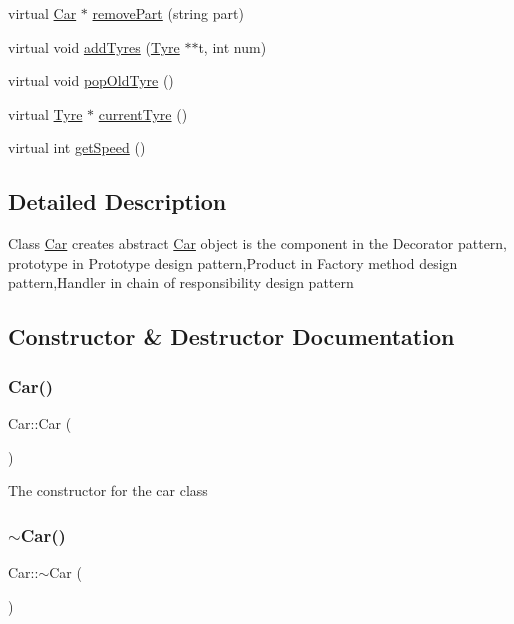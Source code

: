 \begin{DoxyCompactItemize}
\item 
virtual \hyperlink{classCar}{Car} $\ast$ \hyperlink{classCar_a54018ac7e84e79c8bfc1a8fba5e45b16}{remove\+Part} (string part)
\item 
virtual void \hyperlink{classCar_a5c5f22cb9232b88a53a4ffc324824aa1}{add\+Tyres} (\hyperlink{classTyre}{Tyre} $\ast$$\ast$t, int num)
\item 
virtual void \hyperlink{classCar_a5859a9475be0c26341ca4f3acf23a2ea}{pop\+Old\+Tyre} ()
\item 
virtual \hyperlink{classTyre}{Tyre} $\ast$ \hyperlink{classCar_aadd6f69cf389b293a5e8a098ebc75f1d}{current\+Tyre} ()
\item 
virtual int \hyperlink{classCar_a18e48b5cf9815216b8e82351d36b8d9f}{get\+Speed} ()
\end{DoxyCompactItemize}


\subsection{Detailed Description}
Class \hyperlink{classCar}{Car} creates abstract \hyperlink{classCar}{Car} object is the component in the Decorator pattern, prototype in Prototype design pattern,Product in Factory method design pattern,Handler in chain of responsibility design pattern 

\subsection{Constructor \& Destructor Documentation}
\mbox{\label{classCar_a1c803f7c5038d3e31b368b0d0a35493c}} 
\subsubsection{\texorpdfstring{Car()}{Car()}}
{\footnotesize\ttfamily Car\+::\+Car (\begin{DoxyParamCaption}{ }\end{DoxyParamCaption})}

The constructor for the car class \mbox{\label{classCar_a5933bb06e96b159fe339a128abda888a}} 
\subsubsection{\texorpdfstring{$\sim$\+Car()}{~Car()}}
{\footnotesize\ttfamily Car\+::$\sim$\+Car (\begin{DoxyParamCaption}{ }\end{DoxyParamCaption})\hspace{0.3cm}{\ttfamily [virtual]}}

